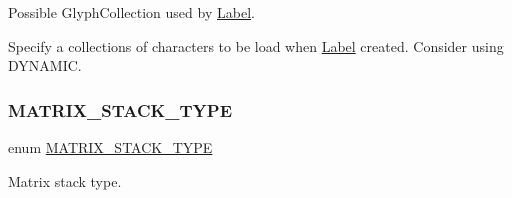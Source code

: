Possible Glyph\+Collection used by \hyperlink{classLabel}{Label}. 

Specify a collections of characters to be load when \hyperlink{classLabel}{Label} created. Consider using D\+Y\+N\+A\+M\+IC. \mbox{\label{group__base_ga4d146cef7130a8f3a953d46964ea3905}} 
\subsubsection{\texorpdfstring{M\+A\+T\+R\+I\+X\+\_\+\+S\+T\+A\+C\+K\+\_\+\+T\+Y\+PE}{MATRIX\_STACK\_TYPE}\hspace{0.1cm}{\footnotesize\ttfamily [1/2]}}
{\footnotesize\ttfamily enum \hyperlink{group__base_ga4d146cef7130a8f3a953d46964ea3905}{M\+A\+T\+R\+I\+X\+\_\+\+S\+T\+A\+C\+K\+\_\+\+T\+Y\+PE}\hspace{0.3cm}{\ttfamily [strong]}}



Matrix stack type. 

